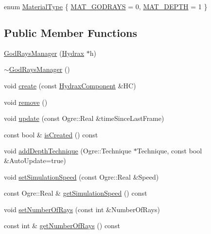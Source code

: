 \begin{CompactItemize}
\item 
enum \hyperlink{class_hydrax_1_1_god_rays_manager_88654235c3d8c74a152a8b81b9a419cb}{MaterialType} \{ \hyperlink{class_hydrax_1_1_god_rays_manager_88654235c3d8c74a152a8b81b9a419cbc48ce8001d4a4963cbb2b7ef37dd24dc}{MAT\_\-GODRAYS} =  0, 
\hyperlink{class_hydrax_1_1_god_rays_manager_88654235c3d8c74a152a8b81b9a419cbd4f1fac272fd8b2ec734eeacc3c6bfbd}{MAT\_\-DEPTH} =  1
 \}
\subsection*{Public Member Functions}
\begin{CompactItemize}
\item 
\hyperlink{class_hydrax_1_1_god_rays_manager_f655dc90ddc7963fcdbbe567bc2c2f7a}{GodRaysManager} (\hyperlink{class_hydrax_1_1_hydrax}{Hydrax} $\ast$h)
\item 
\hyperlink{class_hydrax_1_1_god_rays_manager_6c76b08ac42e38a3621eac4f71d7f3ae}{$\sim$GodRaysManager} ()
\item 
void \hyperlink{class_hydrax_1_1_god_rays_manager_d6e8cfa4b9bde36b668d04ae3cfe8d00}{create} (const \hyperlink{namespace_hydrax_e8e15abf83a51b0cf514c7d1a133650a}{HydraxComponent} \&HC)
\item 
void \hyperlink{class_hydrax_1_1_god_rays_manager_c4f9cdb2271b323d518c7bc84e3bf2da}{remove} ()
\item 
void \hyperlink{class_hydrax_1_1_god_rays_manager_90ec2ead8e869ab4388641de1edeba11}{update} (const Ogre::Real \&timeSinceLastFrame)
\item 
const bool \& \hyperlink{class_hydrax_1_1_god_rays_manager_2843f0e85cd38ccd93c43698cfddae21}{isCreated} () const 
\item 
void \hyperlink{class_hydrax_1_1_god_rays_manager_be86da8a21691f1bac9d817147c9edba}{addDepthTechnique} (Ogre::Technique $\ast$Technique, const bool \&AutoUpdate=true)
\item 
void \hyperlink{class_hydrax_1_1_god_rays_manager_b8080a305138ef10e0f18f9037f99a8d}{setSimulationSpeed} (const Ogre::Real \&Speed)
\item 
const Ogre::Real \& \hyperlink{class_hydrax_1_1_god_rays_manager_707a5affb30167956b5d7d0696633ac2}{getSimulationSpeed} () const 
\item 
void \hyperlink{class_hydrax_1_1_god_rays_manager_ed0d897dae3ae6c585a616d071f02c71}{setNumberOfRays} (const int \&NumberOfRays)
\item 
const int \& \hyperlink{class_hydrax_1_1_god_rays_manager_b3f75e765c4b537d0c8162591edae631}{getNumberOfRays} () const 

\end{CompactItemize}
\end{CompactItemize}
